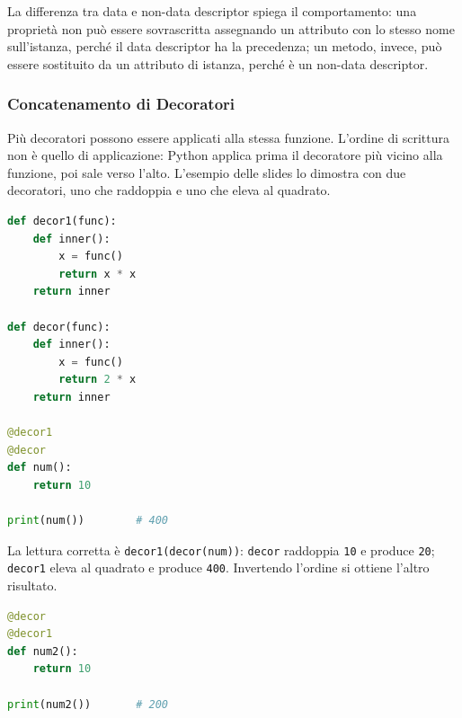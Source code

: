 \documentclass[12pt]{extarticle}
\begin{document}
\noindent La differenza tra data e non-data descriptor spiega il comportamento: una proprietà non può essere sovrascritta assegnando un attributo con lo stesso nome sull'istanza, perché il data descriptor ha la precedenza; un metodo, invece, può essere sostituito da un attributo di istanza, perché è un non-data descriptor.

\subsubsection{Concatenamento di Decoratori}

\noindent Più decoratori possono essere applicati alla stessa funzione. L'ordine di scrittura non è quello di applicazione: Python applica prima il decoratore più vicino alla funzione, poi sale verso l'alto. L'esempio delle slides lo dimostra con due decoratori, uno che raddoppia e uno che eleva al quadrato.

\begin{lstlisting}[language=Python]
def decor1(func):
    def inner():
        x = func()
        return x * x
    return inner

def decor(func):
    def inner():
        x = func()
        return 2 * x
    return inner

@decor1
@decor
def num():
    return 10

print(num())        # 400
\end{lstlisting}

\noindent La lettura corretta è \texttt{decor1(decor(num))}: \texttt{decor} raddoppia \texttt{10} e produce \texttt{20}; \texttt{decor1} eleva al quadrato e produce \texttt{400}. Invertendo l'ordine si ottiene l'altro risultato.

\begin{lstlisting}[language=Python]
@decor
@decor1
def num2():
    return 10

print(num2())       # 200
\end{lstlisting}

\begin{center}
\end{center}
\end{document}
